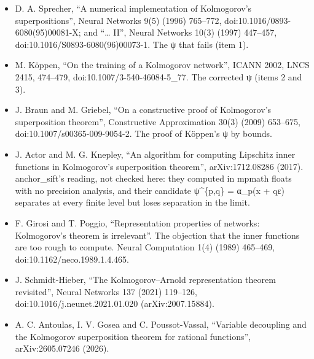 \begin{itemize}
\item D. A. Sprecher, “A numerical implementation of Kolmogorov's superpositions”, Neural Networks 9(5) (1996) 765–772, doi:10.1016/0893-6080(95)00081-X; and “… II”, Neural Networks 10(3) (1997) 447–457, doi:10.1016/S0893-6080(96)00073-1. The ψ that fails (item 1).
\item M. Köppen, “On the training of a Kolmogorov network”, ICANN 2002, LNCS 2415, 474–479, doi:10.1007/3-540-46084-5\_\allowbreak{}77. The corrected ψ (items 2 and 3).
\item J. Braun and M. Griebel, “On a constructive proof of Kolmogorov's superposition theorem”, Constructive Approximation 30(3) (2009) 653–675, doi:10.1007/s00365-009-9054-2. The proof of Köppen's ψ by bounds.
\item J. Actor and M. G. Knepley, “An algorithm for computing Lipschitz inner functions in Kolmogorov's superposition theorem”, arXiv:1712.08286 (2017). anchor\_\allowbreak{}sift's reading, not checked here: they computed in mpmath floats with no precision analysis, and their candidate ψ\textasciicircum{}\{p,q\} = α\_\allowbreak{}p(x + qε) separates at every finite level but loses separation in the limit.
\item F. Girosi and T. Poggio, “Representation properties of networks: Kolmogorov's theorem is irrelevant”. The objection that the inner functions are too rough to compute. Neural Computation 1(4) (1989) 465–469, doi:10.1162/neco.1989.1.4.465.
\item J. Schmidt-Hieber, “The Kolmogorov–Arnold representation theorem revisited”, Neural Networks 137 (2021) 119–126, doi:10.1016/j.neunet.2021.01.020 (arXiv:2007.15884).
\item A. C. Antoulas, I. V. Gosea and C. Poussot-Vassal, “Variable decoupling and the Kolmogorov superposition theorem for rational functions”, arXiv:2605.07246 (2026).
\end{itemize}

